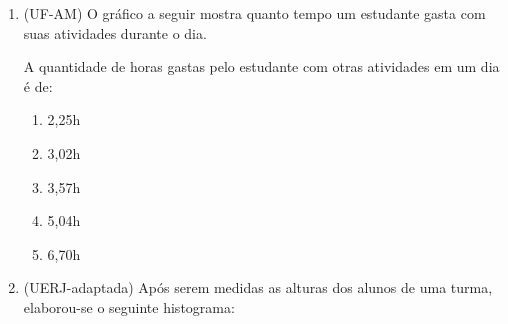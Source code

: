 {\begin{enumerate}
\begin{enumerate}
\item {} 
Holanda.

\item {} 
Israel.

\item {} 
México.

\item {} 
Rússia.

\end{enumerate}
\newpage
\item (UF-AM) O gráfico a seguir mostra quanto tempo um estudante gasta com suas atividades durante o dia.

\begin{figure}[H]
\centering
\capstart

\label{\detokenize{PE103-E:id9}}\label{\detokenize{PE103-E:id26}}\end{figure}

A quantidade de horas gastas pelo estudante com otras atividades em um dia é de:
\begin{enumerate}
\item {} 
2,25h

\item {} 
3,02h

\item {} 
3,57h

\item {} 
5,04h

\item {} 
6,70h

\end{enumerate}

\item (UERJ-adaptada)  Após serem medidas as alturas dos alunos de uma turma, elaborou-se o seguinte histograma:
\label{chap-est1-exerc-17}


\end{enumerate}}
